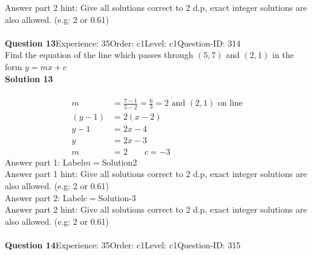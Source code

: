 \documentclass{article}
\begin{document}
Answer part 2 hint: \hspace{15pt}Give all solutions correct to 2 d.p, exact integer solutions are also allowed. (e.g: 2 or 0.61)\\
\\[4pt]
\noindent\textbf{Question 13}\hspace{20pt}Experience: 35\hspace{20pt}Order: c1\hspace{20pt}Level: c1\hspace{20pt}Question-ID: 314\\[2pt]
Find the equation of the line which passes through $(5,7)$ and $(2,1)$ in the form $y=mx+c$\\[4pt]
\noindent\textbf{Solution 13}\\[2pt]
\\[-35pt]\begin{align*}
m&=\displaystyle\frac{7-1}{5-2}=\displaystyle\frac{6}{3}=2 \,\,\text{and}\,\, (2,1) \,\,\text{on line}\\[2pt]
(y-1)&=2(x-2)\\[2pt]
y-1&=2x-4\\[2pt]
y&=2x-3\\[2pt]
m&=2 \qquad c=-3
\end{align*}
Answer part 1: \hspace{10pt}Label\hspace{10pt}$m=$\hspace{10pt}Solution\hspace{10pt}2\\
Answer part 1 hint: \hspace{15pt}Give all solutions correct to 2 d.p, exact integer solutions are also allowed. (e.g: 2 or 0.61)\\
Answer part 2: \hspace{10pt}Label\hspace{10pt}$c=$\hspace{10pt}Solution\hspace{10pt}-3\\
Answer part 2 hint: \hspace{15pt}Give all solutions correct to 2 d.p, exact integer solutions are also allowed. (e.g: 2 or 0.61)\\
\\[4pt]
\noindent\textbf{Question 14}\hspace{20pt}Experience: 35\hspace{20pt}Order: c1\hspace{20pt}Level: c1\hspace{20pt}Question-ID: 315\\[2pt]
\end{document}
